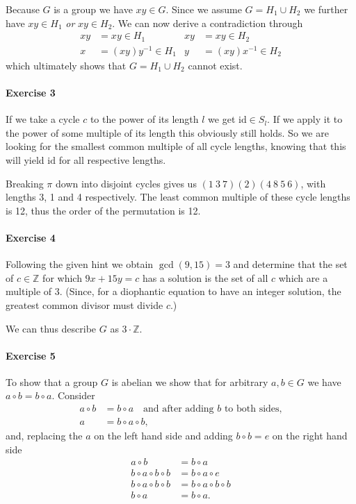\documentclass{article}
\newcommand{\id}{\text{id}}
\begin{document}
Because $G$ is a group we have $xy \in G$. Since we assume $G = H_1 \cup H_2$ we further have $xy \in H_1$ \emph{or} $xy \in H_2$. We can now derive a contradiction through
\begin{align*}
    xy &= xy \in H_1 & xy &= xy \in H_2 \\
    x &= (xy)y^{-1} \in H_1 & y &= (xy)x^{-1} \in H_2
\end{align*}
which ultimately shows that $G = H_1 \cup H_2$ cannot exist.

\paragraph{Exercise 3}

If we take a cycle $c$ to the power of its length $l$ we get $\id \in S_{l}$. If we apply it to the power of some multiple of its length this obviously still holds. So we are looking for the smallest common multiple of all cycle lengths, knowing that this will yield $\id$ for all respective lengths.

Breaking $\pi$ down into disjoint cycles gives us $(1\ 3\ 7)(2)(4\ 8\ 5\ 6)$, with lengths 3, 1 and 4 respectively. The least common multiple of these cycle lengths is 12, thus the order of the permutation is 12.

\paragraph{Exercise 4}

Following the given hint we obtain $\gcd(9, 15) = 3$ and determine that the set of $c \in \mathbb{Z}$ for which $9x + 15y = c$ has a solution is the set of all $c$ which are a multiple of 3. (Since, for a diophantic equation to have an integer solution, the greatest common divisor must divide $c$.)

We can thus describe $G$ as $3 \cdot \mathbb{Z}$.

\paragraph{Exercise 5}

To show that a group $G$ is abelian we show that for arbitrary $a, b \in G$ we have $a \circ b = b \circ a$. Consider
\begin{align*}
    a \circ b &= b \circ a \quad \text{and after adding $b$ to both sides,}\\
    a &= b \circ a \circ b,
\end{align*}
and, replacing the $a$ on the left hand side and adding $b \circ b = e$ on the right hand side
\begin{align*}
    a \circ b &= b \circ a \\
    b \circ a \circ b \circ b &= b \circ a \circ e \\
    b \circ a \circ b \circ b &= b \circ a \circ b \circ b \\
    b \circ a &= b \circ a.
\end{align*}
\end{document}
